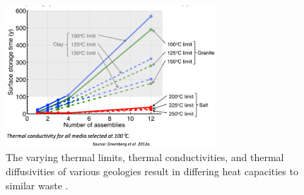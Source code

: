 \begin{figure}[htbp!]
  \begin{center}
    \includegraphics[width=0.7\textwidth]{greenberg_thermal.eps}
  \end{center}
  \caption{The varying thermal limits, thermal conductivities, and thermal 
    diffusivities of various geologies result in differing heat capacities to 
    similar waste \cite{greenberg_application_2012}.}
  \label{fig:greenberg_thermal}
\end{figure}
